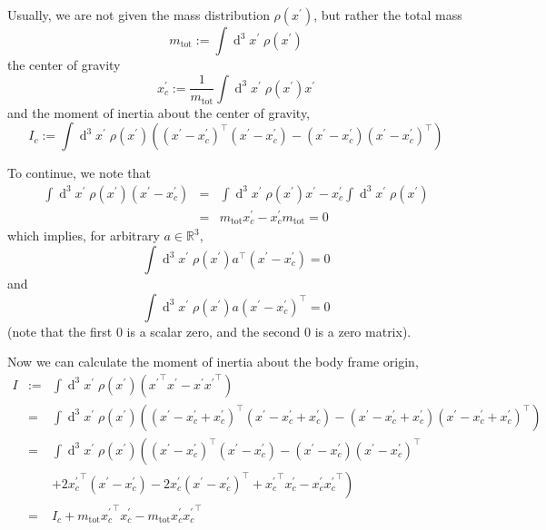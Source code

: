 \documentclass[a4paper]{article}
\begin{document}
Usually, we are not given the mass distribution $\rho(x^\prime)$, but rather the total mass
\begin{equation}
m_\mathrm{tot} := \int \operatorname{d}^3\!x^\prime\; \rho(x^\prime)
\end{equation}
the center of gravity
\begin{equation}
\label{eqn:xpcdef}
x_c^\prime := \frac{1}{m_\mathrm{tot}} \int \operatorname{d}^3\!x^\prime\; \rho(x^\prime) x^\prime
\end{equation}
and the moment of inertia about the center of gravity,
\begin{equation}
I_c := \int \operatorname{d}^3\!x^\prime\; \rho(x^\prime) \left( (x^\prime - x_c^\prime)^\top (x^\prime - x_c^\prime) - (x^\prime - x_c^\prime)(x^\prime - x_c^\prime)^\top \right)
\end{equation}

To continue, we note that
\begin{eqnarray}
\nonumber \int \operatorname{d}^3\!x^\prime\; \rho(x^\prime) (x^\prime - x_c^\prime)
&=& \int \operatorname{d}^3\!x^\prime\; \rho(x^\prime) x^\prime
- x_c^\prime \int \operatorname{d}^3\!x^\prime\; \rho(x^\prime)\\
&=& m_\mathrm{tot} x_c^\prime - x_c^\prime m_\mathrm{tot} = 0
\end{eqnarray}
which implies, for arbitrary $a \in \mathbb{R}^3$,
\begin{equation}
\int \operatorname{d}^3\!x^\prime\; \rho(x^\prime) a^\top (x^\prime - x_c^\prime) = 0
\end{equation}
and
\begin{equation}
\int \operatorname{d}^3\!x^\prime\; \rho(x^\prime) a (x^\prime - x_c^\prime)^\top = 0
\end{equation}
(note that the first 0 is a scalar zero, and the second 0 is a zero matrix).

Now we can calculate the moment of inertia about the body frame origin,
\begin{eqnarray}
\label{eqn:i}
\nonumber I &:=& \int \operatorname{d}^3\!x^\prime\; \rho(x^\prime) \left( {x^\prime}^\top x^\prime - x^\prime {x^\prime}^\top \right)\\
\nonumber&=& \int \operatorname{d}^3\!x^\prime\; \rho(x^\prime) \left( (x^\prime - x_c^\prime + x_c^\prime)^\top (x^\prime - x_c^\prime + x_c^\prime) - (x^\prime - x_c^\prime + x_c^\prime)(x^\prime - x_c^\prime + x_c^\prime)^\top \right)\\
\nonumber&=& \int \operatorname{d}^3\!x^\prime\; \rho(x^\prime) \left( (x^\prime - x_c^\prime)^\top (x^\prime - x_c^\prime) - (x^\prime - x_c^\prime)(x^\prime - x_c^\prime)^\top \right.\\
\nonumber && \left. + 2 {x_c^\prime}^\top (x^\prime - x_c^\prime) - 2 x_c^\prime (x^\prime - x_c^\prime)^\top + {x_c^\prime}^\top x_c^\prime - x_c^\prime {x_c^\prime}^\top \right)\\
&=& I_c + m_\mathrm{tot}{x_c^\prime}^\top x_c^\prime - m_\mathrm{tot}x_c^\prime {x_c^\prime}^\top
\end{eqnarray}
\end{document}
